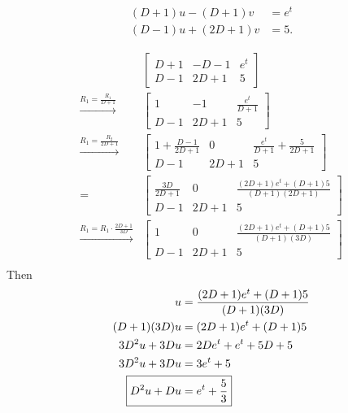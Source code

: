 \documentclass{zc-ust-hw}
\begin{document}
\begin{enumerate}
    \begin{align*}
      (D+1)u-(D+1)v&=e^{t} \\
      (D-1)u+(2D+1)v&=5
    .\end{align*}
    \begin{sol}
      \begin{align}
        &\left[\begin{array}{cc|c}
            D+1 & -D-1 & e^{t} \\
            D-1 & 2D+1 & 5
        \end{array}\right]\\
        \xrightarrow{R_{1}=\frac{R_{1}}{D+1}}
        &\left[\begin{array}{cc|c}
            1 & -1 & \frac{e^{t}}{D+1} \\
            D-1 & 2D+1 & 5
        \end{array}\right]\\
        \xrightarrow{R_{1}=\frac{R_{2}}{2D+1}}
        &\left[\begin{array}{cc|c}
            1+\frac{D-1}{2D+1} & 0 & \frac{e^{t}}{D+1}+\frac{5}{2D+1} \\
            D-1 & 2D+1 & 5
        \end{array}\right] \\
        =
        &\left[\begin{array}{cc|c}
            \frac{3D}{2D+1} & 0 & \frac{(2D+1)e^{t}+(D+1)5  }{(D+1)(2D+1)} \\
            D-1 & 2D+1 & 5
        \end{array}\right] \\
        \xrightarrow{R_{1}=R_{1}\cdot \frac{2D+1}{3D}}
        &\left[\begin{array}{cc|c}
            1 & 0 & \frac{(2D+1)e^{t}+(D+1)5  }{(D+1)(3D)} \\
            D-1 & 2D+1 & 5
        \end{array}\right] \\
      \end{align}
        Then
        \begin{align}
          u &= \frac{(2D+1)e^{t}+(D+1)5  }{(D+1)(3D)} \\
          (D+1)(3D)u &= (2D+1)e^{t}+(D+1)5 \\
          3D^2u+3Du &= 2De^{t}+e^{t}+5D+5 \\
          3D^2u+3Du &= 3e^{t} + 5 \\
          \Aboxed{ D^2u+Du &= e^{t} + \frac{5}{3} }
        \end{align}

\end{sol}
\end{enumerate}
\end{document}
